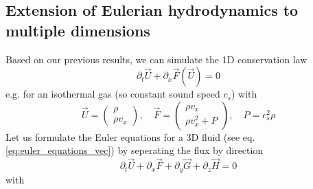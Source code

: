 \subsection{Extension of Eulerian hydrodynamics to multiple dimensions}
Based on our previous results, we can simulate the 1D conservation law
\begin{equation}
    \partial_t \vec{U} + \partial_x \vec{F}(\vec{U}) = 0
\end{equation}
e.g. for an isothermal gas (so constant sound speed $c_s$) with
\begin{equation}
    \vec{U} = \begin{pmatrix} \rho \\ \rho v_x \end{pmatrix}, \quad \vec{F} = \begin{pmatrix} \rho v_x \\ \rho v_x^2 + P \end{pmatrix}, \quad P = c_s^2 \rho
\end{equation}
Let us formulate the \textcolor{blue1}{Euler equations for a 3D fluid} (see eq. \ref{eq:euler_equations_vec}) by seperating the flux by direction
\begin{equation}
    \label{eq:3d_split}
    \partial_t \vec{U} + \partial_x \vec{F} + \partial_y \vec{G} + \partial_z \vec{H} = 0
\end{equation}
with
